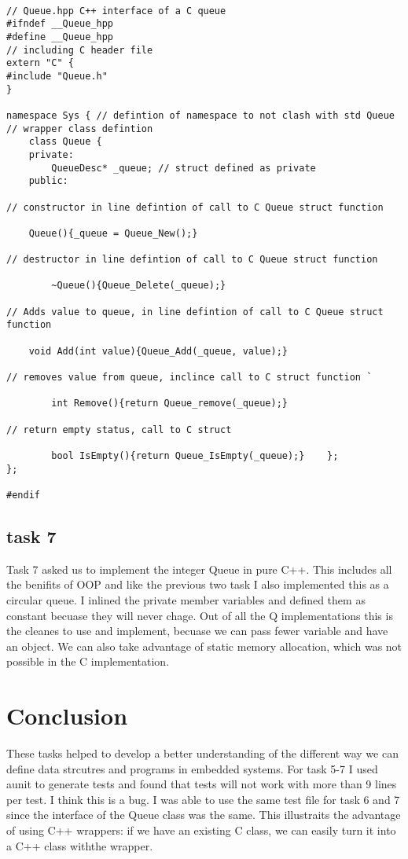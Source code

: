 \begin{lstlisting}

// Queue.hpp C++ interface of a C queue
#ifndef __Queue_hpp
#define __Queue_hpp
// including C header file
extern "C" {
#include "Queue.h"
}

namespace Sys { // defintion of namespace to not clash with std Queue
// wrapper class defintion
    class Queue {
    private:
        QueueDesc* _queue; // struct defined as private
    public:

// constructor in line defintion of call to C Queue struct function

    Queue(){_queue = Queue_New();}

// destructor in line defintion of call to C Queue struct function

		~Queue(){Queue_Delete(_queue);} 

// Adds value to queue, in line defintion of call to C Queue struct function

    void Add(int value){Queue_Add(_queue, value);}

// removes value from queue, inclince call to C struct function `

		int Remove(){return Queue_remove(_queue);}   

// return empty status, call to C struct

		bool IsEmpty(){return Queue_IsEmpty(_queue);}    };
};

#endif

\end{lstlisting}

\subsection{task 7}
Task 7 asked us to implement the integer Queue in pure C++. This includes all the benifits of OOP and like the previous two task I also implemented this as a circular queue. I inlined the private member variables and defined them as constant becuase they will never chage. Out of all the Q implementations this is the cleanes to use and implement, becuase we can pass fewer variable and have an object. We can also take advantage of static memory allocation, which was not possible in the C implementation.  

\section{Conclusion}
These tasks helped to develop a better understanding of the different way we can define data strcutres and programs in embedded systems. For task 5-7 I used aunit to generate tests and found that tests will not work with more than 9 lines per test. I think this is a bug. I was able to use the same test file for task 6 and 7 since the interface of the Queue class was the same. This illustraits the advantage of using C++ wrappers: if we have an existing C class, we can easily turn it into a C++ class withthe wrapper.




